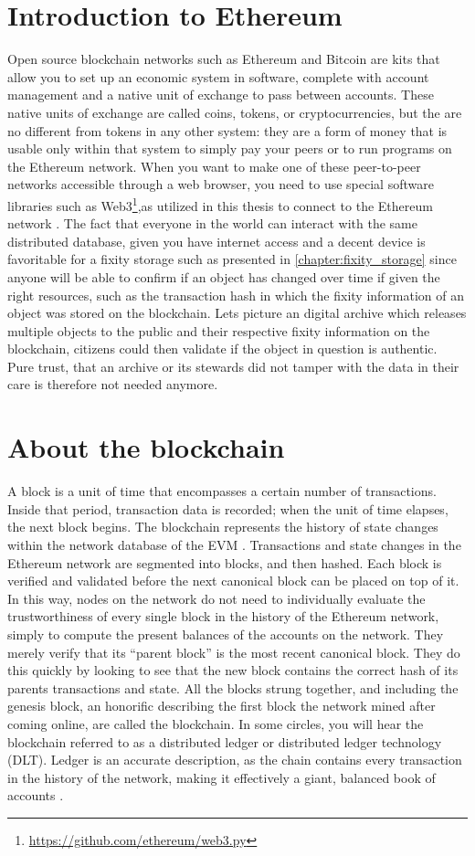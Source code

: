 \section{Introduction to Ethereum}
\label{sec:eth-blockchain}
Open source blockchain networks such as Ethereum and Bitcoin are kits that allow you to set up an economic system in software, complete with account management and a native unit of exchange to pass between accounts. These native units of exchange are called coins, tokens, or cryptocurrencies, but the are no different from tokens in any other system: they are a form of money  that is usable only within that system to simply pay your peers or to run programs on the Ethereum network. 
When you want to make one of these peer-to-peer networks accessible through a web browser, you need to use special software libraries such as Web3\footnote{\url{https://github.com/ethereum/web3.py}},as utilized in this thesis to connect to the Ethereum network \cite[2]{dannen2017introducing}.
The fact that everyone in the world can interact with the same distributed database, given you have internet access and a decent device is favoritable for a fixity storage such as presented in \ref{chapter:fixity_storage} since anyone will be able to confirm if an object has changed over time if given the right resources, such as the transaction hash in which the fixity information of an object was stored on the blockchain. Lets picture an digital archive which releases multiple objects to the public and their respective fixity information on the blockchain, citizens could then validate if the object in question is authentic. Pure trust, that an archive or its stewards did not tamper with the data in their care is therefore not needed anymore.
\section{About the blockchain}
A block is a unit of time that encompasses a certain number of transactions. Inside that period, transaction data is recorded; when the unit of time elapses, the next block begins. The blockchain represents the history of state changes within the network database of the EVM \cite[43]{dannen2017introducing}.
Transactions and state changes in the Ethereum network are segmented into blocks, and then hashed. Each block is verified and validated before the next canonical block can be placed on top of it. In this way, nodes on the network do not need to individually evaluate the trustworthiness of every single block in the history of the Ethereum network, simply to compute the present balances of the accounts on the network. They merely verify that its “parent block” is the most recent canonical block. They do this quickly by looking to see that the new block contains the correct hash of its parents transactions and state. All the blocks strung together, and including the genesis block, an honorific describing the first block the network mined after coming online, are called the blockchain. In some circles, you will hear the blockchain referred to as a distributed ledger or distributed ledger technology (DLT). Ledger is an accurate description, as the chain contains every transaction in the history of the network, making it effectively a giant, balanced book of accounts \cite[55]{dannen2017introducing}. 
